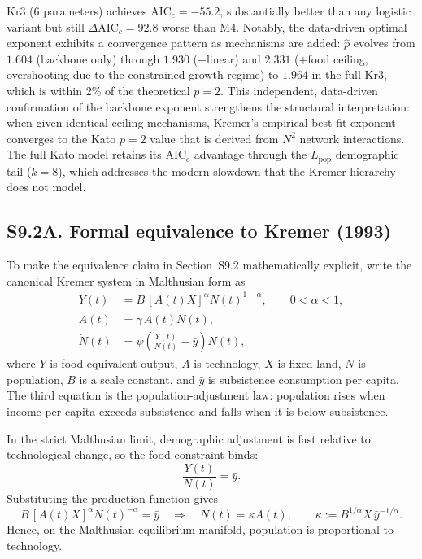 \documentclass[11pt]{article}
\begin{document}
\noindent
Kr3 (6 parameters) achieves AIC$_c=-55.2$, substantially better than any logistic variant but still $\Delta\mathrm{AIC}_c=92.8$ worse than M4.
Notably, the data-driven optimal exponent exhibits a convergence pattern as mechanisms are added: $\hat{p}$ evolves from $1.604$ (backbone only) through $1.930$ ($+$linear) and $2.331$ ($+$food ceiling, overshooting due to the constrained growth regime) to $1.964$ in the full Kr3, which is within 2\% of the theoretical $p=2$.
This independent, data-driven confirmation of the backbone exponent strengthens the structural interpretation: when given identical ceiling mechanisms, Kremer's empirical best-fit exponent converges to the Kato $p=2$ value that is derived from $N^2$ network interactions.
The full Kato model retains its AIC$_c$ advantage through the $L_{\mathrm{pop}}$ demographic tail ($k=8$), which addresses the modern slowdown that the Kremer hierarchy does not model.

\subsection*{S9.2A. Formal equivalence to Kremer (1993)}

To make the equivalence claim in Section~S9.2 mathematically explicit, write the canonical Kremer system in Malthusian form as
\begin{align}
Y(t) &= B\,[A(t)X]^{\alpha} N(t)^{1-\alpha}, \qquad 0<\alpha<1, \\
\dot A(t) &= \gamma\,A(t)N(t), \\
\dot N(t) &= \psi\!\left(\frac{Y(t)}{N(t)}-\bar y\right)N(t),
\end{align}
where $Y$ is food-equivalent output, $A$ is technology, $X$ is fixed land, $N$ is population, $B$ is a scale constant, and $\bar y$ is subsistence consumption per capita. The third equation is the population-adjustment law: population rises when income per capita exceeds subsistence and falls when it is below subsistence.

In the strict Malthusian limit, demographic adjustment is fast relative to technological change, so the food constraint binds:
\begin{equation}
\frac{Y(t)}{N(t)}=\bar y .
\end{equation}
Substituting the production function gives
\begin{equation}
B\,[A(t)X]^{\alpha}N(t)^{-\alpha}=\bar y
\quad\Longrightarrow\quad
N(t)=\kappa A(t),
\qquad
\kappa:=B^{1/\alpha}X\,\bar y^{-1/\alpha}.
\end{equation}
Hence, on the Malthusian equilibrium manifold, population is proportional to technology.
\end{document}
